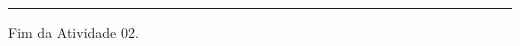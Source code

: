 \documentclass{article}
\begin{document}

\par\noindent\rule{\textwidth}{1pt}
Fim da Atividade 02.
\end{document}
